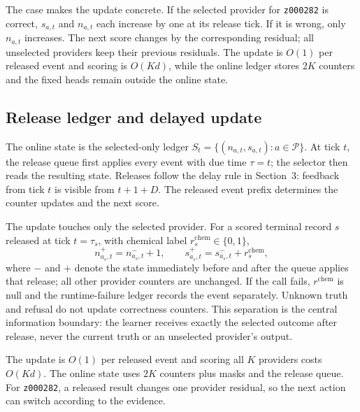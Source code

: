 \documentclass[sigconf,anonymous]{aamas}
\begin{document}
The case makes the update concrete. If the selected provider for \texttt{z000282} is correct, $s_{a,t}$ and $n_{a,t}$ each increase by one at its release tick. If it is wrong, only $n_{a,t}$ increases. The next score changes by the corresponding residual; all unselected providers keep their previous residuals. The update is $O(1)$ per released event and scoring is $O(Kd)$, while the online ledger stores $2K$ counters and the fixed heads remain outside the online state.

\subsection{Release ledger and delayed update}
The online state is the selected-only ledger $S_t=\{(n_{a,t},s_{a,t}) : a\in\mathcal P\}$. At tick $t$, the release queue first applies every event with due time $\tau=t$; the selector then reads the resulting state. Releases follow the delay rule in Section~3: feedback from tick $t$ is visible from $t+1+D$. The released event prefix determines the counter updates and the next score.

The update touches only the selected provider. For a scored terminal record $s$ released at tick $t=\tau_s$, with chemical label $r_s^{\mathrm{chem}}\in\{0,1\}$,
$$
 n_{a_s,t}^{+}=n_{a_s,t}^{-}+1,\qquad
 s_{a_s,t}^{+}=s_{a_s,t}^{-}+r_s^{\mathrm{chem}},
$$
where $-$ and $+$ denote the state immediately before and after the queue applies that release; all other provider counters are unchanged. If the call fails, $r^{\mathrm{chem}}$ is null and the runtime-failure ledger records the event separately. Unknown truth and refusal do not update correctness counters. This separation is the central information boundary: the learner receives exactly the selected outcome after release, never the current truth or an unselected provider's output.

The update is $O(1)$ per released event and scoring all $K$ providers costs $O(Kd)$. The online state uses $2K$ counters plus masks and the release queue. For \texttt{z000282}, a released result changes one provider residual, so the next action can switch according to the evidence.
\end{document}
